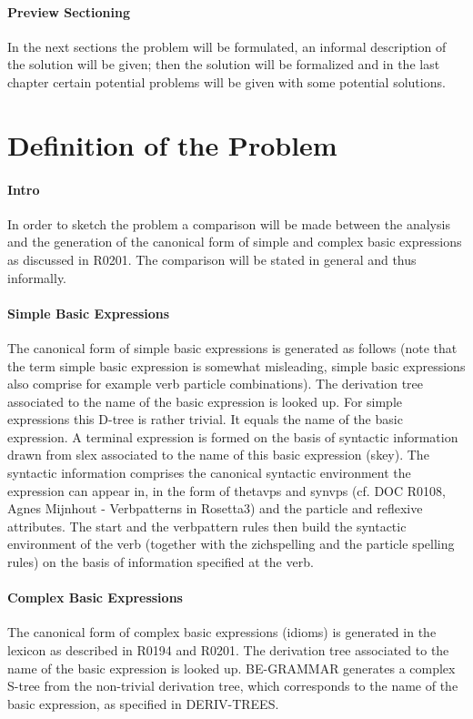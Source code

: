 \paragraph{Preview Sectioning}
In the next sections the problem will be formulated, an informal description of 
the solution will be given; then the solution will be formalized and in the 
last chapter certain potential problems will be given with some potential 
solutions.

\section{Definition of the Problem}
\paragraph{Intro}
In order to sketch the problem a comparison will be made between the analysis 
and the generation of the canonical form of simple and complex basic 
expressions as discussed in R0201. The comparison will be stated in general and 
thus informally.

\paragraph{Simple Basic Expressions}
The canonical form of simple basic expressions is generated as follows (note
that the term simple basic expression is somewhat misleading, simple basic
expressions also comprise for example verb particle combinations). The
derivation tree associated to the name of the basic expression is looked up.
For simple expressions this D-tree is rather trivial. It equals the name of the
basic expression. A terminal expression is formed on the basis of syntactic
information drawn from slex associated to the name of this basic expression
(skey). The syntactic information comprises the canonical syntactic
environment the expression can appear in, in the form of thetavps and synvps
(cf. DOC R0108, Agnes Mijnhout - Verbpatterns in Rosetta3) and the particle and
reflexive attributes. The start and the verbpattern rules then build the
syntactic environment of the verb (together with the zichspelling and the
particle spelling rules) on the basis of information specified at the verb. 

\paragraph{Complex Basic Expressions}
The canonical form of complex basic expressions (idioms) is generated in the
lexicon as described in R0194 and R0201. The derivation tree associated to the
name of the basic expression is looked up. BE-GRAMMAR generates a complex
S-tree from the non-trivial derivation tree, which corresponds to the name of
the basic expression, as specified in DERIV-TREES. 

